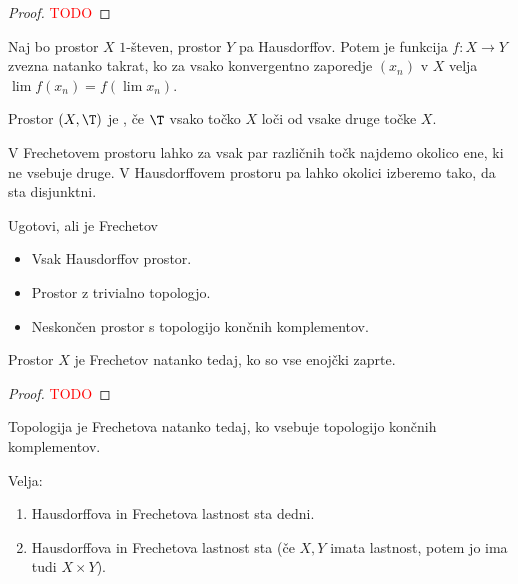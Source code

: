 \begin{proof}
    \textcolor{red}{TODO}
\end{proof}

\begin{izrek}
    Naj bo prostor $X$ $1$-števen, prostor $Y$ pa Hausdorffov. Potem je funkcija $f: X \to Y$ zvezna natanko takrat, ko za vsako konvergentno zaporedje $(x_n)$ v $X$ velja $\lim f(x_n) = f(\lim x_n)$.
\end{izrek}

\begin{definicija}
    Prostor $(X, \T)$ je , če $\T$ vsako točko $X$ loči od vsake druge točke $X$.
\end{definicija}

\begin{opomba}
    V Frechetovem prostoru lahko za vsak par različnih točk najdemo okolico ene, ki ne vsebuje druge. V Hausdorffovem prostoru pa lahko okolici izberemo tako, da sta disjunktni.
\end{opomba}

\begin{primer}
   Ugotovi, ali je Frechetov
    \begin{itemize}
        \item Vsak Hausdorffov prostor.
        \item Prostor z trivialno topologjo.
        \item Neskončen prostor s topologijo končnih komplementov.
    \end{itemize}
\end{primer}

\newpage
\begin{trditev}
    Prostor $X$ je Frechetov natanko tedaj, ko so vse enojčki zaprte.
\end{trditev}

\begin{proof}
    \textcolor{red}{TODO}
\end{proof}

\begin{opomba}
    Topologija je Frechetova natanko tedaj, ko vsebuje topologijo končnih komplementov.
\end{opomba}

\begin{trditev}
    Velja:
    \begin{enumerate}
        \item Hausdorffova in Frechetova lastnost sta dedni.
        \item Hausdorffova in Frechetova lastnost sta  (če $X, Y$ imata lastnost, potem jo ima tudi $X \times Y$).
    \end{enumerate}
\end{trditev}

